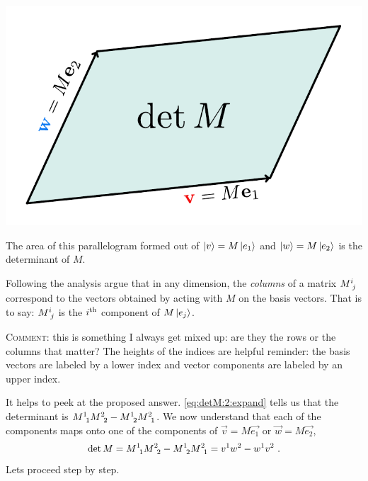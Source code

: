 \begin{marginfigure}%
    \includegraphics[width=\textwidth]{figures/det ParallelogramDet.pdf}
    \caption{The area of this parallelogram formed out of $\left|v\right\rangle = M\left|e_1\right\rangle$ and $\left|w\right\rangle= M\left|e_2\right\rangle$ is the determinant of $M$.}
    \label{fig:det:area}
\end{marginfigure}
\begin{exercise}
Following the analysis argue that in any dimension, the \emph{columns} of a matrix $M\aij{i}{j}$ correspond to the vectors obtained by acting with $M$ on the basis vectors. That is to say: $M\aij{i}{j}$ is the $i^\textnormal{th}$ component of $M\left|e_j\right\rangle$. 

\textsc{Comment}: this is something I always get mixed up: are they the rows or the columns that matter? The heights of the indices are helpful reminder: the basis vectors are labeled by a lower index and vector components are labeled by an upper index.
\end{exercise}

It helps to peek at the proposed answer. \eqref{eq:detM:2:expand} tells us that the determinant is $M\aij{1}{1}M\aij{2}{2} - M\aij{1}{2} M\aij{2}{1}$. We now understand that each of the components maps onto one of the components of $\vec{v}=M\vec{e_1}$ or $\vec{w}=M\vec{e_2}$,
\begin{align}
    \det M = M\aij{1}{1}M\aij{2}{2} - M\aij{1}{2} M\aij{2}{1} 
    = v^1 w^2 - w^1 v^2 
    \ .
\end{align}
Lets proceed step by step. 

